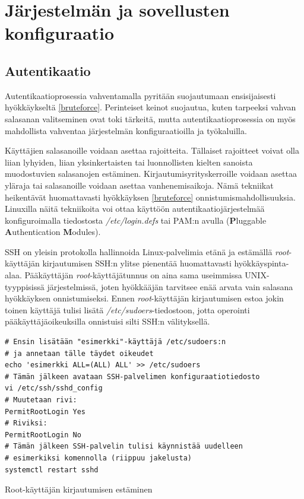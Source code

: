 \section{Järjestelmän ja sovellusten konfiguraatio}\label{sovellusten_konfiguraatio}

\subsection{Autentikaatio}\label{autentikaatio}
Autentikaatioprosessia vahventamalla pyritään suojautumaan ensisijaisesti hyökkäykseltä \ref{bruteforce}. Perinteiset keinot suojautua, kuten tarpeeksi vahvan salasanan valitseminen ovat toki tärkeitä, mutta autentikaatioprosessia on myös mahdollista vahventaa järjestelmän konfiguraatioilla ja työkaluilla.

Käyttäjien salasanoille voidaan asettaa rajoitteita. Tällaiset rajoitteet voivat olla liian lyhyiden, liian yksinkertaisten tai luonnollisten kielten sanoista muodostuvien salasanojen estäminen. Kirjautumisyrityskerroille voidaan asettaa yläraja tai salasanoille voidaan asettaa vanhenemisaikoja. Nämä tekniikat heikentävät huomattavasti hyökkäyksen \ref{bruteforce} onnistumismahdollisuuksia. Linuxilla näitä tekniikoita voi ottaa käyttöön autentikaatiojärjestelmää konfiguroimalla tiedostosta \textit{/etc/login.defs} tai PAM:n avulla (\textbf{P}luggable \textbf{A}uthentication \textbf{M}odules).~\cite{kemp2009linux}

SSH on yleisin protokolla hallinnoida Linux-palvelimia etänä ja estämällä \textit{root}-käyttäjän kirjautumisen SSH:n ylitse pienentää huomattavasti hyökkäyspinta-alaa. Pääkäyttäjän \textit{root}-käyttäjätunnus on aina sama useimmissa UNIX-tyyppisissä järjestelmissä, joten hyökkääjän tarvitsee enää arvata vain salasana hyökkäyksen onnistumiseksi. Ennen \textit{root}-käyttäjän kirjautumisen estoa jokin toinen käyttäjä tulisi lisätä \textit{/etc/sudoers}-tiedostoon, jotta operointi pääkäyttäjäoikeuksilla onnistuisi silti SSH:n välityksellä.~\cite{sshd}~\cite{sudo}

\begin{algorithm}[tbh]
\begin{verbatim}
# Ensin lisätään "esimerkki"-käyttäjä /etc/sudoers:n
# ja annetaan tälle täydet oikeudet
echo 'esimerkki ALL=(ALL) ALL' >> /etc/sudoers
# Tämän jälkeen avataan SSH-palvelimen konfiguraatiotiedosto
vi /etc/ssh/sshd_config
# Muutetaan rivi:
PermitRootLogin Yes
# Riviksi:
PermitRootLogin No
# Tämän jälkeen SSH-palvelin tulisi käynnistää uudelleen
# esimerkiksi komennolla (riippuu jakelusta)
systemctl restart sshd
\end{verbatim}
\caption{Root-käyttäjän kirjautumisen estäminen\label{alg:disable_root_login}}
\end{algorithm}
\newpage{}

